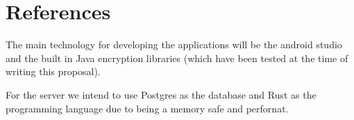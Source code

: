 \documentclass[a4paper]{article}
\begin{document}
\section{References}
The main technology for developing the applications will be the android studio and the built in Java
encryption libraries (which have been tested at the time of writing this proposal).

For the server we intend to use Postgres as the database and Rust as the programming language due to
being a memory safe and perfornat.
\end{document}
